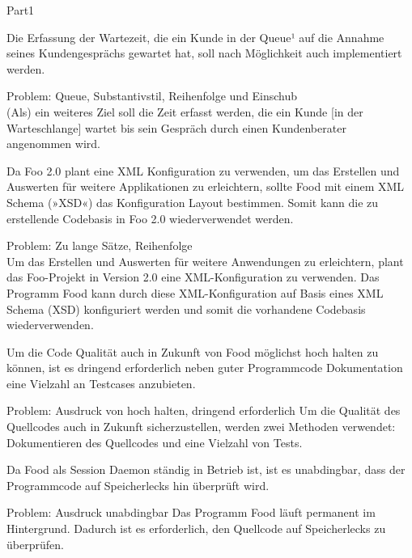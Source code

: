 \documentclass[a4paper,twoside]{article}
\newcommand{\gquote}[1]{\glqq #1\grqq}
\begin{document}
\begin{exam}[Teil I.]{Part1}
\begin{problem}[3]
Die Erfassung der Wartezeit, die ein Kunde in der Queue¹ auf die Annahme seines
Kundengesprächs gewartet hat, soll nach Möglichkeit auch implementiert werden.
\begin{solution}
Problem: \gquote{Queue}, Substantivstil, Reihenfolge und Einschub\\
(Als) ein weiteres Ziel soll die Zeit erfasst werden, die ein Kunde 
[in der Warteschlange] wartet bis sein Gespräch durch einen Kundenberater
angenommen wird.
\end{solution}
\end{problem}

\begin{problem}[3]
Da Foo 2.0 plant eine XML Konfiguration zu verwenden, um das Erstellen und 
Auswerten für weitere Applikationen zu erleichtern, sollte Food mit einem 
XML Schema (»XSD«) das Konfiguration Layout bestimmen. Somit kann die zu
erstellende Codebasis in Foo 2.0 wiederverwendet werden.
\begin{solution}
Problem: Zu lange Sätze, Reihenfolge\\
Um das Erstellen und Auswerten für weitere Anwendungen zu erleichtern, plant
das Foo-Projekt in Version 2.0 eine XML-Konfiguration zu verwenden. Das
Programm Food kann durch diese XML-Konfiguration auf Basis eines XML Schema 
(XSD) konfiguriert werden und somit die vorhandene Codebasis wiederverwenden.
\end{solution}
\end{problem}

\begin{problem}[3]
Um die Code Qualität auch in Zukunft von Food möglichst hoch halten zu können,
ist es dringend erforderlich neben guter Programmcode Dokumentation eine Vielzahl
an Testcases anzubieten.
\begin{solution}
Problem: Ausdruck von \gquote{hoch halten}, \gquote{dringend erforderlich}
Um die Qualität des Quellcodes auch in Zukunft sicherzustellen, werden zwei
Methoden verwendet: Dokumentieren des Quellcodes und eine Vielzahl von Tests.
\end{solution}
\end{problem}

\begin{problem}[3]
Da Food als Session Daemon ständig in Betrieb ist, ist es unabdingbar,
dass der Programmcode auf Speicherlecks hin überprüft wird. 
\begin{solution}
Problem: Ausdruck \gquote{unabdingbar}
Das Programm Food läuft permanent im Hintergrund. Dadurch ist es erforderlich,
den Quellcode auf Speicherlecks zu überprüfen.
\end{solution}
\end{problem}



\end{exam}
\end{document}
